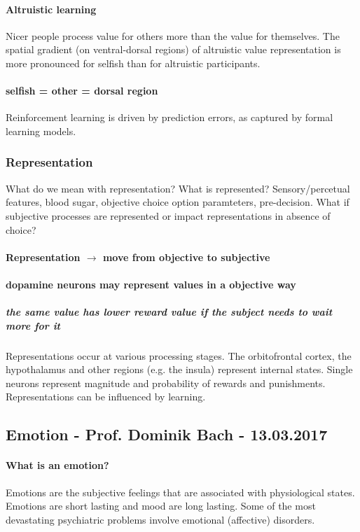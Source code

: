 \documentclass[12pt,article,oneside,a4paper]{memoir}
\begin{document}
\paragraph{Altruistic learning}
Nicer people process value for others more than the value for themselves. The
spatial gradient (on ventral-dorsal regions) of altruistic value representation
is more pronounced for selfish than for altruistic participants.

\paragraph{selfish = other = dorsal region}
Reinforcement learning is driven by prediction errors, as captured by formal
learning models.

\subsubsection{Representation}
What do we mean with representation?
What is represented? Sensory/percetual features, blood sugar, objective choice
option paramteters, pre-decision.
What if subjective processes are represented or impact representations in
absence of choice?

\paragraph{Representation $\rightarrow$ move from objective to subjective}
\paragraph{dopamine neurons may represent values in a objective way}
\subparagraph{the same value has lower reward value if the subject needs to
wait more for it}

Representations occur at various processing stages. The orbitofrontal cortex,
the hypothalamus and other regions (e.g. the insula) represent internal states.
Single neurons represent magnitude and probability of rewards and punishments.
Representations can be influenced by learning.

\newpage
\subsection{Emotion - Prof. Dominik Bach - 13.03.2017}

\paragraph{What is an emotion?}
Emotions are the subjective feelings that are associated with physiological
states. Emotions are short lasting and mood are long lasting. Some of the most
devastating psychiatric problems involve emotional (affective) disorders.
\end{document}
